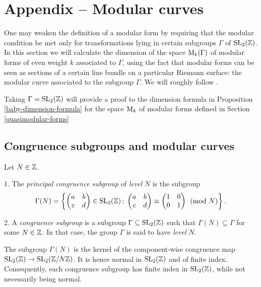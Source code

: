 \section{Appendix – Modular curves}

\newcommand{\jrm}{\mathrm{j}}

One may weaken the definition of a modular form by requiring that the modular condition be met only for transformations lying in certain subgroups $\Gamma$ of $\operatorname{SL}_2(\mathbb{Z})$. In this section we will calculate the dimension of the space $\mathrm{M}_k(\Gamma)$ of modular forms of even weight $k$ associated to $\Gamma$, using the fact that modular forms can be seen as sections of a certain line bundle on a particular Riemann surface: the modular curve associated to the subgroup $\Gamma$. We will roughly follow \cite[Ch.~1-3]{Diamond-Shurman}.

Taking $\Gamma=\operatorname{SL}_2(\mathbb{Z})$ will provide a proof to the dimension formula in Proposition \ref{baby-dimension-formula} for the space $\mathrm{M}_k$ of modular forms defined in Section \ref{quasimodular-forms}

\subsection{Congruence subgroups and modular curves}

\begin{defi}
 Let $N\in \mathbb{Z}$.
 
 1. The \emph{principal congruence subgroup} of \emph{level} $N$ is the subgroup
 \[\Gamma(N)=\left\{\begin{pmatrix} a & b \\ c & d \end{pmatrix}\in\operatorname{SL}_2(\mathbb{Z})\,;\; \begin{pmatrix}a & b \\ c & d\end{pmatrix} \equiv \begin{pmatrix}1 & 0 \\ 0 & 1\end{pmatrix} \pmod{N}\right\}.\]
 
 2. A \emph{congruence subgroup} is a subgroup $\Gamma\subseteq\operatorname{SL}_2(\mathbb{Z})$ such that $\Gamma(N)\subseteq\Gamma$ for some $N\in\mathbb{Z}$. In that case, the group $\Gamma$ is said to have \emph{level} $N$. 
\end{defi}

\begin{rmk}
 The subgroup $\Gamma(N)$ is the kernel of the component-wise congruence map $\operatorname{SL}_2(\mathbb{Z})\to\operatorname{SL}_2(\mathbb{Z}/N\mathbb{Z})$. It is hence normal in $\operatorname{SL}_2(\mathbb{Z})$ and of finite index. Consequently, each congruence subgroup has finite index in $\operatorname{SL}_2(\mathbb{Z})$, while not  necessarily being normal.
\end{rmk}


